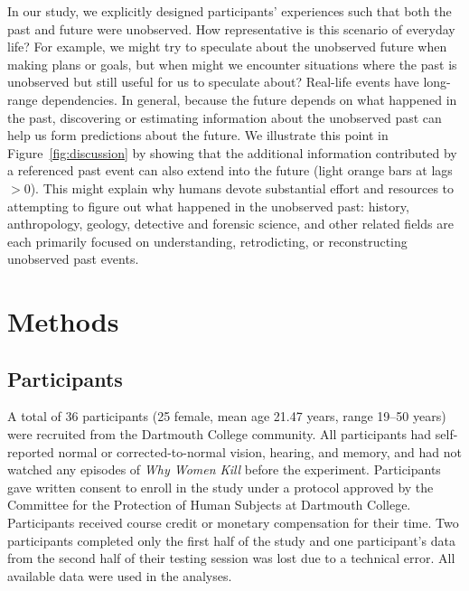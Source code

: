 \documentclass[10pt]{article}
\begin{document}
In our study, we explicitly designed participants' experiences such that both the past and future were unobserved.  How representative is this scenario of everyday life?  For example, we might try to speculate about the unobserved future when making plans or goals, but when might we encounter situations where the past is unobserved but still useful for us to speculate about?  Real-life events have long-range dependencies.  In general, because the future depends on what happened in the past, discovering or estimating information about the unobserved past can help us form predictions about the future.  We illustrate this point in Figure~\ref{fig:discussion} by showing that the additional information contributed by a referenced past event can also extend into the future (light orange bars at lags $> 0$).  This might explain why humans devote substantial effort and resources to attempting to figure out what happened in the unobserved past: history, anthropology, geology, detective and forensic science, and other related fields are each primarily focused on understanding, retrodicting, or reconstructing unobserved past events.


\section*{Methods}
\subsection*{Participants}
A total of 36 participants (25 female, mean age 21.47 years, range 19--50 years) were recruited from the Dartmouth College community. All participants had self-reported normal or corrected-to-normal vision, hearing, and memory, and had not watched any episodes of \textit{Why Women Kill} before the experiment. Participants gave written consent to enroll in the study under a protocol approved by the Committee for the Protection of Human Subjects at Dartmouth College.  Participants received course credit or monetary compensation for their time. Two participants completed only the first half of the study and one participant’s data from the second half of their testing session was lost due to a technical error. All available data were used in the analyses.
\end{document}

